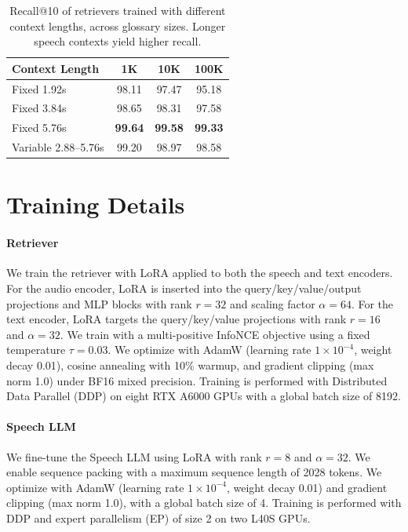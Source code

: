 \begin{table}[t]
\centering
\setlength{\tabcolsep}{4pt}
\begin{tabular}{lccc}
\toprule
Context Length & 1K & 10K & 100K \\
\midrule
Fixed 1.92s & 98.11 & 97.47 & 95.18 \\
Fixed 3.84s & 98.65 & 98.31 & 97.58 \\
Fixed 5.76s & \textbf{99.64} & \textbf{99.58} & \textbf{99.33} \\
Variable 2.88--5.76s & 99.20 & 98.97 & 98.58 \\
\bottomrule
\end{tabular}
\caption{Recall@10 of retrievers trained with different context lengths, across glossary sizes. Longer speech contexts yield higher recall.}
\label{tab:ablation_context}
\end{table}



\section{Training Details}\label{app:training_details}

\paragraph{Retriever}
We train the retriever with LoRA applied to both the speech and text encoders.
For the audio encoder, LoRA is inserted into the query/key/value/output projections and MLP blocks with rank $r{=}32$ and scaling factor $\alpha{=}64$.
For the text encoder, LoRA targets the query/key/value projections with rank $r{=}16$ and $\alpha{=}32$.
We train with a multi-positive InfoNCE objective using a fixed temperature $\tau{=}0.03$.
We optimize with AdamW (learning rate $1\times10^{-4}$, weight decay 0.01), cosine annealing with 10\% warmup, and gradient clipping (max norm 1.0) under BF16 mixed precision.
Training is performed with Distributed Data Parallel (DDP) on eight RTX A6000 GPUs with a global batch size of 8192.

\paragraph{Speech LLM}
We fine-tune the Speech LLM using LoRA with rank $r{=}8$ and $\alpha{=}32$.
We enable sequence packing with a maximum sequence length of 2028 tokens.
We optimize with AdamW (learning rate $1\times10^{-4}$, weight decay 0.01) and gradient clipping (max norm 1.0), with a global batch size of 4.
Training is performed with DDP and expert parallelism (EP) of size 2 on two L40S GPUs.

